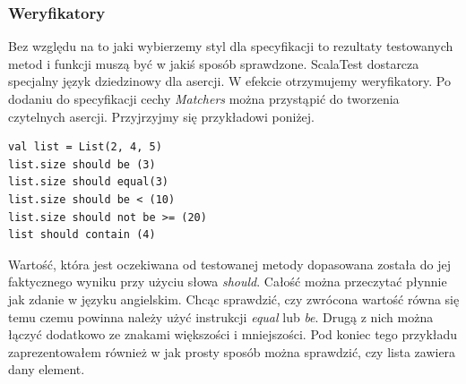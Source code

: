 \documentclass[brudnopis]{xmgr}
\begin{document}

\subsubsection{Weryfikatory}

Bez względu na to jaki wybierzemy styl dla specyfikacji to rezultaty testowanych metod i funkcji muszą być w jakiś sposób sprawdzone. ScalaTest dostarcza specjalny język dziedzinowy dla asercji. W efekcie otrzymujemy weryfikatory. Po dodaniu do specyfikacji cechy \emph{Matchers} można przystąpić do tworzenia czytelnych asercji. Przyjrzyjmy się przykładowi poniżej.

\begin{verbatim}
val list = List(2, 4, 5)
list.size should be (3)
list.size should equal(3)
list.size should be < (10)
list.size should not be >= (20)
list should contain (4)
\end{verbatim}

Wartość, która jest oczekiwana od testowanej metody dopasowana została do jej faktycznego wyniku przy użyciu słowa \emph{should}. Całość można przeczytać płynnie jak zdanie w języku angielskim. 
Chcąc sprawdzić, czy zwrócona wartość równa się temu czemu powinna należy użyć instrukcji \emph{equal} lub \emph{be}. Drugą z nich można łączyć dodatkowo ze znakami większości i mniejszości. Pod koniec tego przykładu zaprezentowałem również w jak prosty sposób można sprawdzić, czy lista zawiera dany element.
\end{document}
